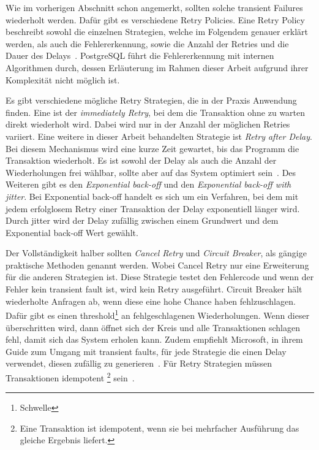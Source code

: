 
Wie im vorherigen Abschnitt schon angemerkt, sollten solche transient Failures wiederholt werden.
Dafür gibt es verschiedene Retry Policies.
Eine Retry Policy beschreibt sowohl die einzelnen Strategien, welche im Folgendem genauer erklärt werden, als auch
die Fehlererkennung, sowie die Anzahl der Retries und die Dauer des Delays~\cite{MicrosoftTransientFaults}.
PostgreSQL führt die Fehlererkennung mit internen Algorithmen durch, dessen Erläuterung im Rahmen dieser Arbeit
aufgrund ihrer Komplexität nicht möglich ist.

Es gibt verschiedene mögliche Retry Strategien, die in der Praxis Anwendung finden.
Eine ist der \emph{immediately Retry}, bei dem die Transaktion ohne zu warten direkt wiederholt wird.
Dabei wird nur in der Anzahl der möglichen Retries variiert.
Eine weitere in dieser Arbeit behandelten Strategie ist \emph{Retry after Delay}.
Bei diesem Mechanismus wird eine kurze Zeit gewartet, bis das Programm die Transaktion wiederholt.
Es ist sowohl der Delay als auch die Anzahl der Wiederholungen frei wählbar, sollte aber auf das System optimiert
sein~\cite{MicrosoftRetryPattern}.
Des Weiteren gibt es den \emph{Exponential back-off} und den \emph{Exponential back-off with jitter}.
Bei Exponential back-off handelt es sich um ein Verfahren, bei dem mit jedem erfolglosem Retry einer Transaktion der
Delay exponentiell länger wird.
Durch jitter wird der Delay zufällig zwischen einem Grundwert und dem Exponential back-off Wert gewählt.

Der Vollständigkeit halber sollten \emph{Cancel Retry} und \emph{Circuit Breaker}, als gängige praktische Methoden
genannt werden.
Wobei Cancel Retry nur eine Erweiterung für die anderen Strategien ist.
Diese Strategie testet den Fehlercode und wenn der Fehler kein transient fault ist, wird kein Retry ausgeführt.
Circuit Breaker hält wiederholte Anfragen ab, wenn diese eine hohe Chance haben fehlzuschlagen.
Dafür gibt es einen threshold\footnote{Schwelle} an fehlgeschlagenen Wiederholungen.
Wenn dieser überschritten wird, dann öffnet sich der Kreis und alle Transaktionen schlagen fehl, damit sich das
System erholen kann.
Zudem empfiehlt Microsoft, in ihrem Guide zum Umgang mit transient faults, für jede Strategie die einen Delay
verwendet, diesen zufällig zu generieren~\cite{MicrosoftTransientFaults}.
Für Retry Strategien müssen Transaktionen idempotent
\footnote{Eine Transaktion ist idempotent, wenn sie bei mehrfacher Ausführung
das gleiche Ergebnis liefert.} sein~\cite{MicrosoftRetryPattern}.
